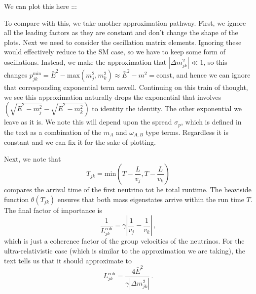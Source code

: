 \documentclass[10pt]{article}
\begin{document}
We can plot this here :::


To compare with this, we take another approximation pathway. First, we ignore all the leading factors as they are constant and don't change the shape of the plots. Next we need to consider the oscillation matrix elements. Ignoring these would effectively reduce to the SM case, so we have to keep some form of oscillations. Instead, we make the approximation that $|\Delta m_{jk}^{2}| \ll 1$, so this changes $p_{jk}^{\text{min}} = \bar{E}^{2} - \text{max}(m_{j}^{2},m_{k}^{2}) \approx \bar{E}^{2} - m^{2} = \text{const}$, and hence we can ignore that corresponding exponential term aswell. Continuing on this train of thought, we see this approximation naturally drops the exponential that involves $\left(\sqrt{\bar{E}^{2} - m_{j}^{2}} - \sqrt{\bar{E}^{2} - m_{k}^{2}}\right)$ to identity the identity. The other exponential we leave as it is. We note this will depend upon the spread $\sigma_{p}$, which is defined in the text as a combination of the $m_{A}$ and $\omega_{A,B}$ type terms. Regardless it is constant and we can fix it for the sake of plotting.

Next, we note that
\begin{equation}
  T_{jk} = \text{min}\left(T - \frac{L}{v_{j}}, T - \frac{L}{v_{k}}\right)
\end{equation}
compares the arrival time of the first neutrino tot he total runtime. The heaviside function $\theta(T_{jk})$ ensures that both mass eigenstates arrive within the run time $T$. The final factor of importance is
\begin{equation}
  \frac{1}{L_{jk}^{\text{coh}}} = \gamma\left |\frac{1}{v_{j}} - \frac{1}{v_{k}}\right|\, ,
\end{equation}
which is just a coherence factor of the group velocities of the neutrinos. For the ultra-relativistic case (which is similar to the approximation we are taking), the text \cite{Akhmedov_2008} tells us that it should approximate to
\begin{equation}
  L_{jk}^{\text{coh}} = \frac{4\bar{E}^{2}}{\gamma|\Delta m_{jk}^{2}|}\,.
\end{equation}
\end{document}
